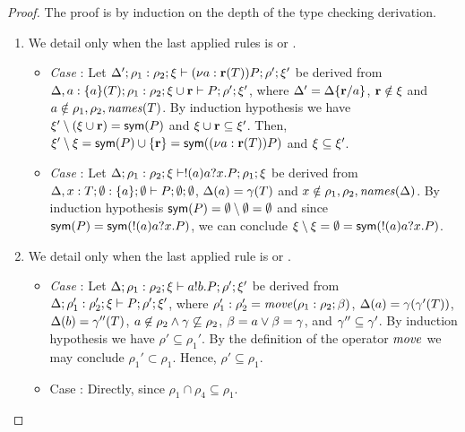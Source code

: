 \begin{proof}
The proof is by induction on the depth of the type checking derivation.
\begin{enumerate}
\item We detail only when the last applied rules is  or .
%
\begin{itemize}
\item 
\emph{Case} : Let $\Delta'; \rho_1: \rho_2; \xi \vdash (\nu a: {\mathbf{r}}(T)) P; \rho'; \xi'$ be derived from $\Delta, a:\{a\}(T); \rho_1: \rho_2; \xi\cup {\mathbf{r}} \vdash P; \rho'; \xi'$, where $\Delta'=\Delta\{{\mathbf{r}}/a\}$, ${\mathbf{r}}\notin \xi$ and $a \notin \rho_1, \rho_2, \mathit{names} (T)$. 
By induction hypothesis we have $\xi'\setminus (\xi\cup {\mathbf{r}})= \mathsf{sym}(P)$ and $\xi \cup {\mathbf{r}} \subseteq \xi'$. 
Then, $\xi'\setminus \xi =\mathsf{sym}(P) \cup \{{\mathbf{r}}\}= \mathsf{sym}((\nu a: {\mathbf{r}}(T)) P)$ and $\xi \subseteq \xi'$.
\item 
\emph{Case} : Let $\Delta; \rho_1: \rho_2; \xi \vdash !(a)a?x.P; \rho_1; \xi$ be derived from $\Delta, x: T; \emptyset: \{a\}; \emptyset \vdash P; \emptyset; \emptyset$,  $\Delta(a)=\gamma(T)$ and $x\notin \rho_1, \rho_2, \mathit{names}(\Delta)$. 
By induction hypothesis $\mathsf{sym}(P)=\emptyset\setminus \emptyset=\emptyset$ and since $\mathsf{sym}(P)=\mathsf{sym}(!(a)a?x.P)$, we can conclude $\xi \setminus \xi= \emptyset =\mathsf{sym}(!(a)a?x.P)$.
\end{itemize}

\item We detail only when the last applied rule is  or .
%
\begin{itemize}
\item
\emph{Case} : Let $\Delta; \rho_1: \rho_2; \xi \vdash a!b.P; \rho'; \xi'$ be derived from $\Delta; \rho_1': \rho_2'; \xi \vdash P; \rho'; \xi'$, where $\rho_1': \rho_2'=\mathit{move} (\rho_1: \rho_2; \beta)$, $\Delta(a)=\gamma(\gamma'(T))$, $\Delta(b)=\gamma''(T)$, $a\not\in\rho_2  \wedge  \gamma\not\subseteq\rho_2$, $\beta=a \vee \beta=\gamma$, and $\gamma''\subseteq \gamma'$. 
By induction hypothesis we have $\rho' \subseteq \rho_1'$. 
By the definition of the operator $\mathit{move}$ we may conclude $\rho_1' \subset \rho_1$. Hence, $\rho' \subseteq \rho_1$. 
\item
Case : Directly, since $\rho_1\cap \rho_4 \subseteq \rho_1$.
\end{itemize}
\end{enumerate}
\end{proof}

